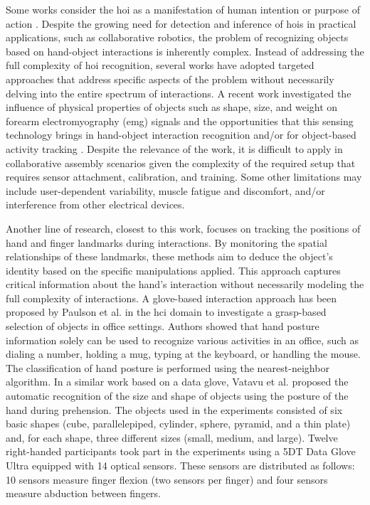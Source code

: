 Some works consider the \acs{hoi} as a manifestation of human intention or purpose of action \cite{Koppula2015,Hayes2017,Furnari2019,Xu2019,Roy2021}. Despite the growing need for detection and inference of \acs{hoi}s in practical applications, such as collaborative robotics, the problem of recognizing objects based on hand-object interactions is inherently complex. Instead of addressing the full complexity of \acs{hoi} recognition, several works have adopted targeted approaches that address specific aspects of the problem without necessarily delving into the entire spectrum of interactions. A recent work investigated the influence of physical properties of objects such as shape, size, and weight on forearm electromyography (\acs{emg}) signals and the opportunities that this sensing technology brings in hand-object interaction recognition and/or for object-based activity tracking \cite{Fan2018}. Despite the relevance of the work, it is difficult to apply in collaborative assembly scenarios given the complexity of the required setup that requires sensor attachment, calibration, and training. Some other limitations may include user-dependent variability, muscle fatigue and discomfort, and/or interference from other electrical devices.   

Another line of research, closest to this work, focuses on tracking the positions of hand and finger landmarks during interactions. By monitoring the spatial relationships of these landmarks, these methods aim to deduce the object's identity based on the specific manipulations applied. This approach captures critical information about the hand's interaction without necessarily modeling the full complexity of interactions. A glove-based interaction approach has been proposed by Paulson et al. \cite{Paulson2011} in the \acs{hci} domain to investigate a grasp-based selection of objects in office settings. Authors showed that hand posture information solely can be used to recognize various activities in an office, such as dialing a number, holding a mug, typing at the keyboard, or handling the mouse. The classification of hand posture is performed using the nearest-neighbor algorithm.  In a similar work based on a data glove, Vatavu et al. \cite{Vatavu2013} proposed the automatic recognition of the size and shape of objects using the posture of the hand during prehension. The objects used in the experiments consisted of six basic shapes (cube, parallelepiped, cylinder, sphere, pyramid, and a thin plate) and, for each shape, three different sizes (small, medium, and large). Twelve right-handed participants took part in the experiments using a 5DT Data Glove Ultra equipped with 14 optical sensors. These sensors are distributed as follows: 10 sensors measure finger flexion (two sensors per finger) and four sensors measure abduction between fingers.

